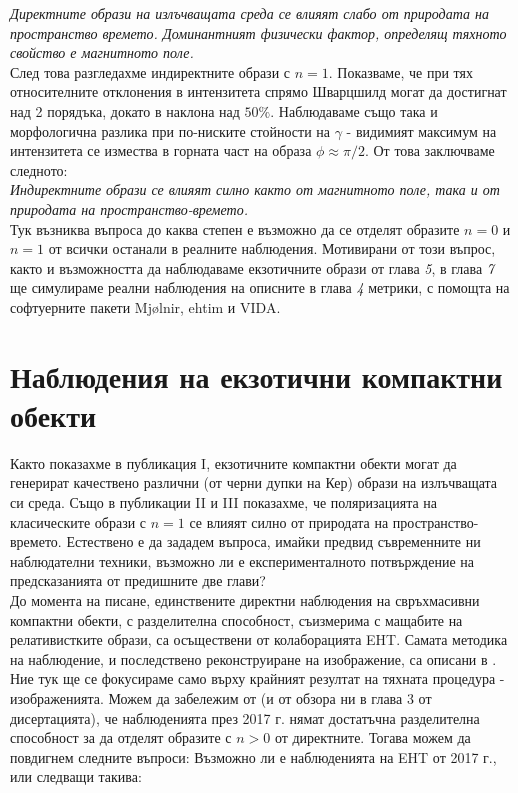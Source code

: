 \documentclass[12pt]{article}
\numberwithin{equation}{section}
\numberwithin{figure}{section}
\begin{document}
	\emph{Директните образи на излъчващата среда се влияят слабо от природата на пространство времето. Доминантният физически фактор, определящ тяхното свойство е магнитното поле.}\\
	
	След това разгледахме индиректните образи с $n = 1$. Показваме, че при тях относителните отклонения в интензитета спрямо Шварцшилд могат да достигнат над 2 порядъка, докато в наклона над $50\%$. Наблюдаваме също така и морфологична разлика при по-ниските стойности на $\gamma$ - видимият максимум на интензитета се измества в горната част на образа $\phi\approx\pi / 2$. От това заключваме следното:\\
	
	\emph{Индиректните образи се влияят силно както от магнитното поле, така и от природата на пространство-времето.}\\

	Тук възниква въпроса до каква степен е възможно да се отделят образите $n = 0$ и $n = 1$ от всички останали в реалните наблюдения. Мотивирани от този въпрос, както и възможността да наблюдаваме екзотичните образи от глава \emph{5}, в глава \emph{7} ще симулираме реални наблюдения на описните в глава \emph{4} метрики, с помощта на софтуерните пакети Mjølnir, ehtim и VIDA.
	
	\section{Наблюдения на екзотични компактни обекти}
	
	Както показахме в публикация I, екзотичните компактни обекти могат да генерират качествено различни (от черни дупки на Кер) образи на излъчващата си среда. Също в публикации II и III показахме, че поляризацията на класическите образи с $n = 1$ се влияят силно от природата на пространство-времето. Естествено е да зададем въпроса, имайки предвид съвременните ни наблюдателни техники, възможно ли е експерименталното потвърждение на предсказанията от предишните две глави?\\
	
	До момента на писане, единствените директни наблюдения на свръхмасивни компактни обекти, с разделителна способност, съизмерима с мащабите на релативистките образи, са осъществени от колаборацията EHT. Самата методика на наблюдение, и последствено реконструиране на изображение, са описани в \cite{EHT_M87_II}\cite{EHT_M87_III}. Ние тук ще се фокусираме само върху крайният резултат на тяхната процедура - изображенията. Можем да забележим от \cite{EHT_M87_I}\cite{EHT_SGR_I} (и от обзора ни в глава 3 от дисертацията), че наблюденията през 2017 г. нямат достатъчна разделителна способност за да отделят образите с $n > 0 $ от директните. Тогава можем да повдигнем следните въпроси: Възможно ли е наблюденията на EHT от 2017 г., или следващи такива:\\
	
\end{document}
